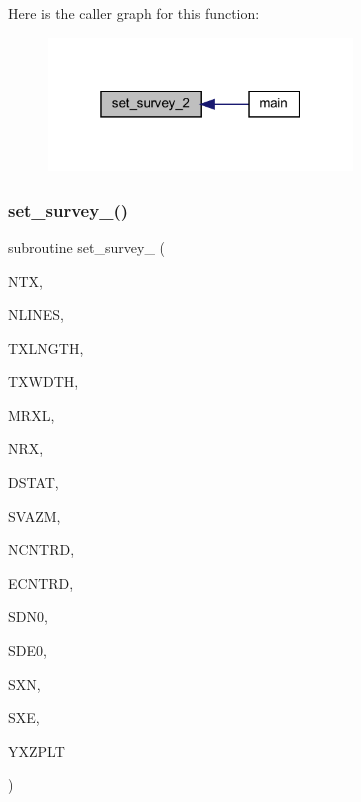 Here is the caller graph for this function\+:\nopagebreak
\begin{figure}[H]
\begin{center}
\leavevmode
\includegraphics[width=229pt]{Leroi_8f90_a8b4a76899e2dcc9f323ef19f765d6679_icgraph}
\end{center}
\end{figure}
\mbox{\label{Leroi_8f90_ac15d94df59fcf9ff238738e88ec7ada0}} 
\subsubsection{\texorpdfstring{set\+\_\+survey\+\_()}{set\_survey\_4()}}
{\footnotesize\ttfamily subroutine set\+\_\+survey\+\_ (\begin{DoxyParamCaption}\item[{integer}]{N\+TX,  }\item[{integer}]{N\+L\+I\+N\+ES,  }\item[{real, dimension(nlines)}]{T\+X\+L\+N\+G\+TH,  }\item[{real, dimension(nlines)}]{T\+X\+W\+D\+TH,  }\item[{integer}]{M\+R\+XL,  }\item[{integer, dimension(nlines)}]{N\+RX,  }\item[{real, dimension(mrxl,nlines)}]{D\+S\+T\+AT,  }\item[{real, dimension(nlines)}]{S\+V\+A\+ZM,  }\item[{real(kind=ql)}]{N\+C\+N\+T\+RD,  }\item[{real(kind=ql)}]{E\+C\+N\+T\+RD,  }\item[{real(kind=ql), dimension(nlines)}]{S\+D\+N0,  }\item[{real(kind=ql), dimension(nlines)}]{S\+D\+E0,  }\item[{real, dimension(4,ntx)}]{S\+XN,  }\item[{real, dimension(4,ntx)}]{S\+XE,  }\item[{real(kind=ql), dimension(3,mrxl,nlines)}]{Y\+X\+Z\+P\+LT }\end{DoxyParamCaption})}

